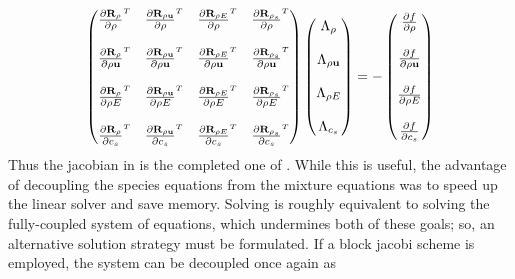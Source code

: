 \begin{equation}
  \begin{pmatrix}
    \rtdiff{\rho}{\rho} & \rtdiff{\rho \vu}{\rho} & 
    \rtdiff{\rho E}{\rho} & \rtdiff{\rho_s}{\rho} \\ \\
    \rtdiff{\rho}{\rho \vu} & \rtdiff{\rho \vu}{\rho \vu} & 
    \rtdiff{\rho E}{\rho \vu} & \rtdiff{\rho_s}{\rho \vu} \\ \\
    \rtdiff{\rho}{\rho E} & \rtdiff{\rho \vu}{\rho E} & 
    \rtdiff{\rho E}{\rho E} & \rtdiff{\rho_s}{\rho E} \\ \\
    \rtdiff{\rho}{c_s} & \rtdiff{\rho \vu}{c_s} & 
    \rtdiff{\rho E}{c_s} & \rtdiff{\rho_s}{c_s}
  \end{pmatrix}
  \begin{pmatrix}
    \adjlam{\rho} \\ \\
    \adjlam{\rho \vu} \\ \\
    \adjlam{\rho E} \\ \\
    \adjlam{c_s}
  \end{pmatrix}
  = -
  \begin{pmatrix}
    \pd{f}{\rho} \\ \\
    \pd{f}{\rho \vu} \\ \\
    \pd{f}{\rho E} \\ \\
    \pd{f}{c_s}
  \end{pmatrix}
  \label{full-adjoint}
\end{equation}
Thus the jacobian in  is the completed one of
.  While this is useful, the advantage of
decoupling the species equations from the mixture equations was to speed up the
linear solver and save memory.  Solving  is roughly
equivalent to solving the fully-coupled system of equations, which undermines
both of these goals; so, an alternative solution strategy must be formulated.  If
a block jacobi scheme is employed, the system can be decoupled once again as
